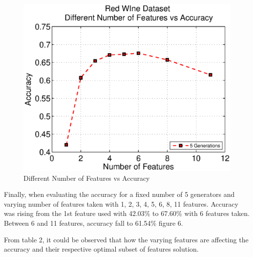 \documentclass[11pt,onecolumn,a4paper]{article}
\begin{document}
      \begin{figure}[h!]
        \centering
        \includegraphics[width=0.6\linewidth]{img/winefeat2.eps}
       \caption{Different Number of Features vs Accuracy}
      \end{figure}
Finally, when evaluating the accuracy for a fixed number of 5 generators and varying number of features taken with 1, 2, 3, 4, 5, 6, 8, 11 features. Accuracy was rising from the 1st feature used with 42.03\% to 67.60\% with 6 features taken. Between 6 and 11 features, accuracy fall to 61.54\% figure 6.
   
   
   \begin{table}[t]
   \caption{Red Wine Varying Features}
   \end{table}
From table 2, it could be observed that how the varying features are affecting the accuracy and their respective optimal subset of features solution.
\end{document}
